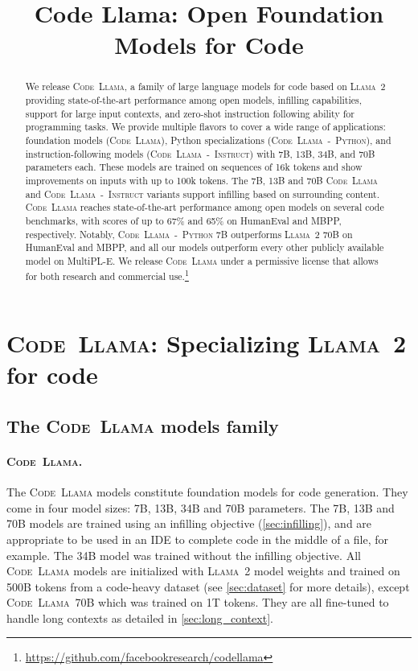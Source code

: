 \title{Code Llama: Open Foundation Models for Code}

\begin{abstract}
We release \textsc{Code~Llama}, a family of large language models for code based on \textsc{Llama~2} providing state-of-the-art performance among open models, infilling capabilities, support for large input contexts, and zero-shot instruction following ability for programming tasks. We provide multiple flavors to cover a wide range of applications: foundation models (\textsc{Code~Llama}), Python specializations (\textsc{Code~Llama~-~Python}), and instruction-following models (\textsc{Code~Llama~-~Instruct}) with 7B, 13B, 34B, and 70B parameters each. These models are trained on sequences of 16k tokens and show improvements on inputs with up to 100k tokens. The 7B, 13B and 70B \textsc{Code~Llama} and \textsc{Code~Llama~-~Instruct} variants support infilling based on surrounding content.
\textsc{Code~Llama} reaches state-of-the-art performance among open models on several code benchmarks, with scores of up to 67\% and 65\% on HumanEval and MBPP, respectively. Notably, \textsc{Code~Llama~-~Python} 7B outperforms \textsc{Llama~2} 70B on HumanEval and MBPP, and all our models outperform every other publicly available model on MultiPL-E. We release \textsc{Code~Llama} under a permissive license that allows for both research and commercial use.\footnote{
\url{https://github.com/facebookresearch/codellama}}
\end{abstract}

\section{\textsc{Code~Llama}: Specializing \textsc{Llama~2} for code}
\label{sec:method}

\subsection{The \textsc{Code~Llama} models family}

\paragraph{\textsc{Code~Llama}.} The \textsc{Code~Llama} models constitute foundation models for code generation. They come in four model sizes: 7B, 13B, 34B and 70B parameters. The 7B, 13B and 70B models are trained using an infilling objective (\ref{sec:infilling}), and are appropriate to be used in an IDE to complete code in the middle of a file, for example. The 34B model was trained without the infilling objective. All \textsc{Code~Llama} models are initialized with \textsc{Llama~2} model weights and trained on 500B tokens from a code-heavy dataset (see \ref{sec:dataset} for more details), except \textsc{Code~Llama}~70B which was trained on 1T tokens. They are all fine-tuned to handle long contexts as detailed in \ref{sec:long_context}.

